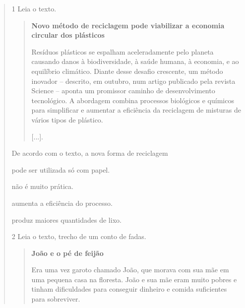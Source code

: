 \begin{quote}
\num{1} Leia o texto.

\begin{quote}
\textbf{Novo método de reciclagem pode viabilizar a economia circular dos plásticos}

Resíduos plásticos se espalham aceleradamente pelo planeta causando
danos à biodiversidade, à saúde humana, à economia, e ao equilíbrio
climático. Diante desse desafio crescente, um método inovador --
descrito, em outubro, num artigo publicado pela revista Science --
aponta um promissor caminho de desenvolvimento tecnológico. A abordagem
combina processos biológicos e químicos para simplificar e aumentar a
eficiência da reciclagem de misturas de vários tipos de plástico.

{[}...{]}.

\end{quote}

De acordo com o texto, a nova forma de reciclagem

\begin{escolha}
\item pode ser utilizada só com papel.

\item não é muito prática.

\item aumenta a eficiência do processo.

\item produz maiores quantidades de lixo.
\end{escolha}


\num{2} Leia o texto, trecho de um conto de fadas.

\begin{quote}
\textbf{João e o pé de feijão}

Era uma vez garoto chamado João, que morava com sua mãe em uma pequena
casa na floresta. João e sua mãe eram muito pobres e tinham dificuldades
para conseguir dinheiro e comida suficientes para sobreviver.


\end{quote}
\end{quote}
